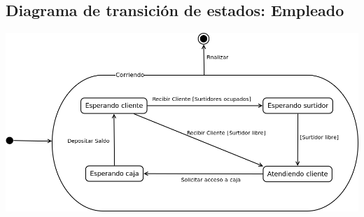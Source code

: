 \documentclass{article}
\begin{document}
\subsection{Diagrama de transición de estados: Empleado}
\includegraphics[width=\textwidth]{diagramaTransicionEstadosEmpleado}



\end{document}
